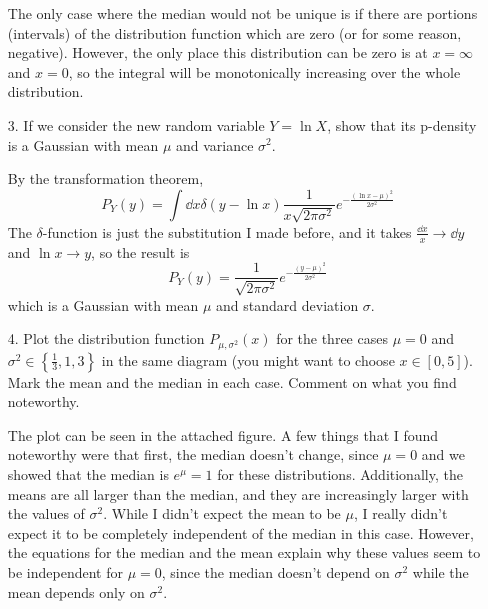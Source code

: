 \documentclass[a4paper,twoside]{article}
\begin{document}
\begin{itemize}
\begin{problem}
\begin{equation}
            \end{equation}
            The only case where the median would not be unique is if there are portions (intervals) of the distribution function which are zero (or for some reason, negative). However, the only place this distribution can be zero is at $ x = \infty $ and $ x = 0 $, so the integral will be monotonically increasing over the whole distribution.
        \end{problem}
    \item[3.] If we consider the new random variable $ Y = \ln{X} $, show that its p-density is a Gaussian with mean $ \mu $ and variance $ \sigma^2 $.
        \begin{problem}
            By the transformation theorem,
            \begin{equation}
                P_{Y}(y) = \int \dd{x} \delta(y - \ln{x}) \frac{1}{x \sqrt{2 \pi \sigma^2}} e^{- \frac{(\ln{x} - \mu)^2}{2 \sigma^2}}
            \end{equation}
            The $\delta$-function is just the substitution I made before, and it takes $ \frac{\dd{x}}{x} \to \dd{y} $ and $ \ln{x} \to y $, so the result is
            \begin{equation}
                P_Y(y) = \frac{1}{\sqrt{2 \pi \sigma^2}} e^{- \frac{(y - \mu)^2}{2 \sigma^2}}
            \end{equation}
            which is a Gaussian with mean $ \mu $ and standard deviation $ \sigma $.
        \end{problem}
    \item[4.] Plot the distribution function $ P_{\mu, \sigma^2}(x) $ for the three cases $ \mu = 0 $ and $ \sigma^2 \in \left\{ \frac{1}{3}, 1, 3 \right\} $ in the same diagram (you might want to choose $ x \in [0,5] $). Mark the mean and the median in each case. Comment on what you find noteworthy.
        \begin{problem}
            The plot can be seen in the attached figure. A few things that I found noteworthy were that first, the median doesn't change, since $ \mu = 0 $ and we showed that the median is $ e^{\mu} = 1 $ for these distributions. Additionally, the means are all larger than the median, and they are increasingly larger with the values of $ \sigma^2 $. While I didn't expect the mean to be $ \mu $, I really didn't expect it to be completely independent of the median in this case. However, the equations for the median and the mean explain why these values seem to be independent for $ \mu = 0 $, since the median doesn't depend on $ \sigma^2 $ while the mean depends only on $ \sigma^2 $.

\end{problem}
\end{itemize}
\end{document}
